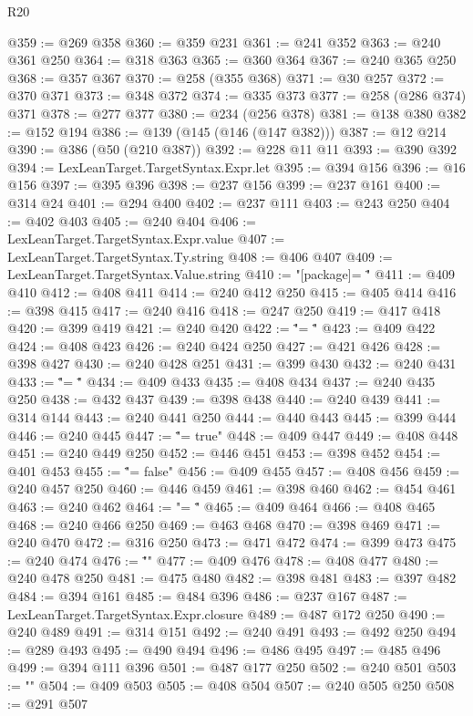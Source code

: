 \begin{lexlean}{R20}
\begin{coremodule}
@359 := @269 @358
@360 := @359 @231
@361 := @241 @352
@363 := @240 @361 @250
@364 := @318 @363
@365 := @360 @364
@367 := @240 @365 @250
@368 := @357 @367
@370 := @258 (@355 @368)
@371 := @30 @257
@372 := @370 @371
@373 := @348 @372
@374 := @335 @373
@377 := @258 (@286 @374) @371
@378 := @277 @377
@380 := @234 (@256 @378)
@381 := @138 @380
@382 := @152 @194
@386 := @139 (@145 (@146 (@147 @382)))
@387 := @12 @214
@390 := @386 (@50 (@210 @387))
@392 := @228 @11 @11
@393 := @390 @392
@394 := LexLeanTarget.TargetSyntax.Expr.let
@395 := @394 @156
@396 := @16 @156
@397 := @395 @396
@398 := @237 @156
@399 := @237 @161
@400 := @314 @24
@401 := @294 @400
@402 := @237 @111
@403 := @243 @250
@404 := @402 @403
@405 := @240 @404
@406 := LexLeanTarget.TargetSyntax.Expr.value
@407 := LexLeanTarget.TargetSyntax.Ty.string
@408 := @406 @407
@409 := LexLeanTarget.TargetSyntax.Value.string
@410 := "[package]\nname = \""
@411 := @409 @410
@412 := @408 @411
@414 := @240 @412 @250
@415 := @405 @414
@416 := @398 @415
@417 := @240 @416
@418 := @247 @250
@419 := @417 @418
@420 := @399 @419
@421 := @240 @420
@422 := "\"\nversion = \""
@423 := @409 @422
@424 := @408 @423
@426 := @240 @424 @250
@427 := @421 @426
@428 := @398 @427
@430 := @240 @428 @251
@431 := @399 @430
@432 := @240 @431
@433 := "\"\nedition = \""
@434 := @409 @433
@435 := @408 @434
@437 := @240 @435 @250
@438 := @432 @437
@439 := @398 @438
@440 := @240 @439
@441 := @314 @144
@443 := @240 @441 @250
@444 := @440 @443
@445 := @399 @444
@446 := @240 @445
@447 := "\"\npublish = true"
@448 := @409 @447
@449 := @408 @448
@451 := @240 @449 @250
@452 := @446 @451
@453 := @398 @452
@454 := @401 @453
@455 := "\"\npublish = false"
@456 := @409 @455
@457 := @408 @456
@459 := @240 @457 @250
@460 := @446 @459
@461 := @398 @460
@462 := @454 @461
@463 := @240 @462
@464 := "\n\n[lib]\npath = \""
@465 := @409 @464
@466 := @408 @465
@468 := @240 @466 @250
@469 := @463 @468
@470 := @398 @469
@471 := @240 @470
@472 := @316 @250
@473 := @471 @472
@474 := @399 @473
@475 := @240 @474
@476 := "\"\n{}\n"
@477 := @409 @476
@478 := @408 @477
@480 := @240 @478 @250
@481 := @475 @480
@482 := @398 @481
@483 := @397 @482
@484 := @394 @161
@485 := @484 @396
@486 := @237 @167
@487 := LexLeanTarget.TargetSyntax.Expr.closure
@489 := @487 @172 @250
@490 := @240 @489
@491 := @314 @151
@492 := @240 @491
@493 := @492 @250
@494 := @289 @493
@495 := @490 @494
@496 := @486 @495
@497 := @485 @496
@499 := @394 @111 @396
@501 := @487 @177 @250
@502 := @240 @501
@503 := "\n"
@504 := @409 @503
@505 := @408 @504
@507 := @240 @505 @250
@508 := @291 @507

\end{coremodule}
\end{lexlean}
